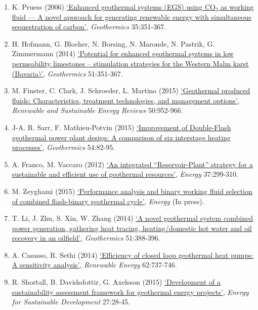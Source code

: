 \documentclass[12pts,a4paper]{report}%
\begin{document}
\begin{enumerate}[label=\bfseries Group \arabic*:]
%
\item K. Pruess (2006) \href{http://dx.doi.org/10.1016/j.geothermics.2006.08.002}{`Enhanced geothermal systems (EGS) using CO$_{2}$ as working fluid — A novel approach for generating renewable energy with simultaneous sequestration of carbon'}, {\it Geothermics} 35:351-367.
%
\item H. Hofmann, G. Blocher, N. Borsing, N. Maronde, N. Pastrik, G. Zimmermann (2014) \href{http://dx.doi.org/10.1016/j.geothermics.2014.03.003}{`Potential for enhanced geothermal systems in low permeability limestones – stimulation strategies for the Western Malm karst (Bavaria)'}, {\it Geothermics} 51:351-367.
%
\item M. Finster, C. Clark, J. Schroeder, L. Martino (2015) \href{http://dx.doi.org/10.1016/j.rser.2015.05.059}{`Geothermal produced fluids: Characteristics, treatment technologies, and management options'}, {\it Renewable and Sustainable Energy Reviews} 50:952-966.
%
\item J-A. R. Sarr, F. Mathieu-Potvin (2015) \href{http://dx.doi.org/10.1016/j.geothermics.2014.12.002}{`Improvement of Double-Flash geothermal power plant design: A comparison of six interstage heating processes'}, {\it Geothermics} 54:82-95.
%
\item A. Franco, M. Vaccaro (2012) \href{http://dx.doi.org/10.1016/j.energy.2011.11.029}{`An integrated “Reservoir-Plant” strategy for a sustainable and efficient use of geothermal resources'}, {\it Energy} 37:299-310.
%
\item M. Zeyghami (2015) \href{http://dx.doi.org/10.1016/j.energy.2015.05.092}{`Performance analysis and binary working fluid selection of combined flash-binary geothermal cycle'}, {\it Energy} (In press).
%
\item T. Li, J. Zhu, S. Xin, W. Zhang (2014) \href{http://dx.doi.org/10.1016/j.geothermics.2014.03.009}{`A novel geothermal system combined power generation, gathering heat tracing, heating/domestic hot water and oil recovery in an oilfield'}, {\it Geothermics} 51:388-396.
%
\item A. Casasso, R. Sethi (2014) \href{http://dx.doi.org/10.1016/j.renene.2013.08.019}{`Efficiency of closed loop geothermal heat pumps: A sensitivity analysis'}, {\it Renewable Energy} 62:737-746.
%
\item R. Shortall, B. Davidsdottir, G. Axelsson (2015) \href{http://dx.doi.org/10.1016/j.esd.2015.02.004}{`Development of a sustainability assessment framework for geothermal energy projects'}, {\it Energy for Sustainable Development} 27:28-45.

\end{enumerate}
\end{document}
